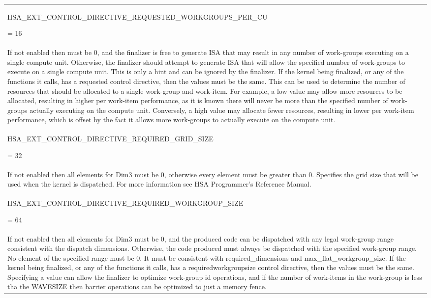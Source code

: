 \documentclass[final]{book}
\newcommand{\reftyp}[1]{#1}
\newcommand{\refenu}[1]{\reftyp{#1}}
\begin{document}
\begin{longtable}{@{\hspace{2em}}p{\linewidth-2em}}
\hspace{-2em}\hypertarget{group__finalizer_1gga143d9e622dfd7889d52fb5eb5ed1ffdbae6659470b66232e7ec4a749a032dc95d}{\refenu{HSA_\-EXT_\-CONTROL_\-DIRECTIVE_\-REQUESTED_\-WORKGROUPS_\-PER_\-CU}} = 16\\If not enabled then must be 0, and the finalizer is free to generate ISA that may result in any number of work-groups executing on a single compute unit. Otherwise, the finalizer should attempt to generate ISA that will allow the specified number of work-groups to execute on a single compute unit. This is only a hint and can be ignored by the finalizer. If the kernel being finalized, or any of the functions it calls, has a requested control directive, then the values must be the same. This can be used to determine the number of resources that should be allocated to a single work-group and work-item. For example, a low value may allow more resources to be allocated, resulting in higher per work-item performance, as it is known there will never be more than the specified number of work-groups actually executing on the compute unit. Conversely, a high value may allocate fewer resources, resulting in lower per work-item performance, which is offset by the fact it allows more work-groups to actually execute on the compute unit.\\[2mm]
\hspace{-2em}\hypertarget{group__finalizer_1gga143d9e622dfd7889d52fb5eb5ed1ffdbaa9878485a06df4090cba80c85acb32be}{\refenu{HSA_\-EXT_\-CONTROL_\-DIRECTIVE_\-REQUIRED_\-GRID_\-SIZE}} = 32\\If not enabled then all elements for Dim3 must be 0, otherwise every element must be greater than 0. Specifies the grid size that will be used when the kernel is dispatched. For more information see HSA Programmer's Reference Manual.\\[2mm]
\hspace{-2em}\hypertarget{group__finalizer_1gga143d9e622dfd7889d52fb5eb5ed1ffdbab26301028f39a1ac099aae9e74251438}{\refenu{HSA_\-EXT_\-CONTROL_\-DIRECTIVE_\-REQUIRED_\-WORKGROUP_\-SIZE}} = 64\\If not enabled then all elements for Dim3 must be 0, and the produced code can be dispatched with any legal work-group range consistent with the dispatch dimensions. Otherwise, the code produced must always be dispatched with the specified work-group range. No element of the specified range must be 0. It must be consistent with required_\-dimensions and max_\-flat_\-workgroup_\-size. If the kernel being finalized, or any of the functions it calls, has a requiredworkgroupsize control directive, then the values must be the same. Specifying a value can allow the finalizer to optimize work-group id operations, and if the number of work-items in the work-group is less tha the WAVESIZE then barrier operations can be optimized to just a memory fence.\\[2mm]

\end{longtable}
\end{document}
